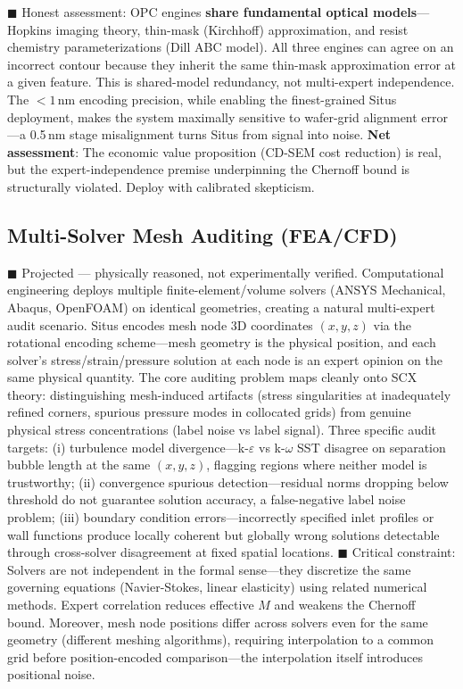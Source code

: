 \documentclass[12pt,a4paper]{article}
\begin{document}
\textcolor{warning}{$\blacksquare$ Honest assessment}: OPC engines \textbf{share fundamental optical models}—Hopkins imaging theory, thin-mask (Kirchhoff) approximation, and resist chemistry parameterizations (Dill ABC model). All three engines can agree on an incorrect contour because they inherit the same thin-mask approximation error at a given feature. This is shared-model redundancy, not multi-expert independence. The $<1$\,nm encoding precision, while enabling the finest-grained Situs deployment, makes the system maximally sensitive to wafer-grid alignment error—a 0.5\,nm stage misalignment turns Situs from signal into noise. \textbf{Net assessment}: The economic value proposition (CD-SEM cost reduction) is real, but the expert-independence premise underpinning the Chernoff bound is structurally violated. Deploy with calibrated skepticism.

\subsection{Multi-Solver Mesh Auditing (FEA/CFD)}

\textcolor{projected}{$\blacksquare$ Projected — physically reasoned, not experimentally verified.}
Computational engineering deploys multiple finite-element/volume solvers (ANSYS Mechanical, Abaqus, OpenFOAM) on identical geometries, creating a natural multi-expert audit scenario. Situs encodes mesh node 3D coordinates $(x,y,z)$ via the rotational encoding scheme—mesh geometry is the physical position, and each solver's stress/strain/pressure solution at each node is an expert opinion on the same physical quantity. The core auditing problem maps cleanly onto SCX theory: distinguishing mesh-induced artifacts\cite{roache1997,oberkampf2002} (stress singularities at inadequately refined corners, spurious pressure modes in collocated grids) from genuine physical stress concentrations (label noise vs label signal). Three specific audit targets: (i) turbulence model divergence—k-$\varepsilon$ vs k-$\omega$ SST disagree on separation bubble length at the same $(x,y,z)$, flagging regions where neither model is trustworthy; (ii) convergence spurious detection—residual norms dropping below threshold do not guarantee solution accuracy, a false-negative label noise problem; (iii) boundary condition errors—incorrectly specified inlet profiles or wall functions produce locally coherent but globally wrong solutions detectable through cross-solver disagreement at fixed spatial locations. \textcolor{warning}{$\blacksquare$ Critical constraint}: Solvers are not independent in the formal sense—they discretize the same governing equations (Navier-Stokes, linear elasticity) using related numerical methods. Expert correlation reduces effective $M$ and weakens the Chernoff bound. Moreover, mesh node positions differ across solvers even for the same geometry (different meshing algorithms), requiring interpolation to a common grid before position-encoded comparison—the interpolation itself introduces positional noise.
\end{document}
